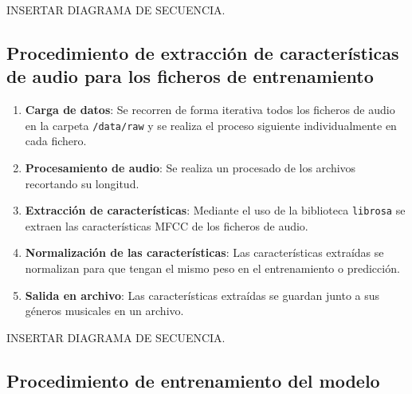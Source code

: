 INSERTAR DIAGRAMA DE SECUENCIA.

\subsection{Procedimiento de extracción de características de audio para los ficheros de entrenamiento}

\begin{enumerate}
\tightlist

\item \textbf{Carga de datos}: Se recorren de forma iterativa todos los ficheros de audio en la carpeta \texttt{/data/raw} y se realiza el proceso siguiente individualmente en cada fichero.

\item \textbf{Procesamiento de audio}: Se realiza un procesado de los archivos recortando su longitud.

\item \textbf{Extracción de características}: Mediante el uso de la biblioteca \texttt{librosa} se extraen las características MFCC de los ficheros de audio.

\item \textbf{Normalización de las características}: Las características extraídas se normalizan para que tengan el mismo peso en el entrenamiento o predicción.

\item \textbf{Salida en archivo}: Las características extraídas se guardan junto a sus géneros musicales en un archivo.

\end{enumerate}

INSERTAR DIAGRAMA DE SECUENCIA.

\subsection{Procedimiento de entrenamiento del modelo}

